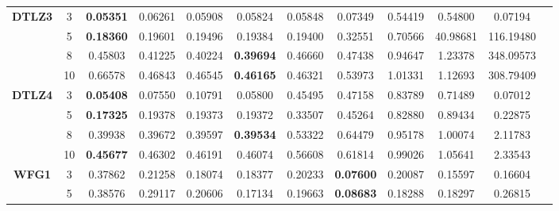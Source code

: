 \documentclass{sig-alternate}
\begin{document}
\begin{table}[!htb]
\begin{tabular}{|c|c|c|c|c|c|c|c|c|c|c|c|}
		\multirow{4}{*}{\textbf{DTLZ3}} & 3          & \textbf{0.05351} & 0.06261           & 0.05908               & 0.05824          & 0.05848             & 0.07349             & 0.54419            & 0.54800              & 0.07194          \\ \cline{2-11} 
		& 5          & \textbf{0.18360} & 0.19601           & 0.19496               & 0.19384          & 0.19400             & 0.32551             & 0.70566            & 40.98681             & 116.19480        \\ \cline{2-11} 
		& 8          & 0.45803          & 0.41225           & 0.40224               & \textbf{0.39694} & 0.46660             & 0.47438             & 0.94647            & 1.23378              & 348.09573        \\ \cline{2-11} 
		& 10         & 0.66578          & 0.46843           & 0.46545               & \textbf{0.46165} & 0.46321             & 0.53973             & 1.01331            & 1.12693              & 308.79409        \\ \hline
		\multirow{4}{*}{\textbf{DTLZ4}} & 3          & \textbf{0.05408} & 0.07550           & 0.10791               & 0.05800          & 0.45495             & 0.47158             & 0.83789            & 0.71489              & 0.07012          \\ \cline{2-11} 
		& 5          & \textbf{0.17325} & 0.19378           & 0.19373               & 0.19372          & 0.33507             & 0.45264             & 0.82880            & 0.89434              & 0.22875          \\ \cline{2-11} 
		& 8          & 0.39938          & 0.39672           & 0.39597               & \textbf{0.39534} & 0.53322             & 0.64479             & 0.95178            & 1.00074              & 2.11783          \\ \cline{2-11} 
		& 10         & \textbf{0.45677} & 0.46302           & 0.46191               & 0.46074          & 0.56608             & 0.61814             & 0.99026            & 1.05641              & 2.33543          \\ \hline
		\multirow{4}{*}{\textbf{WFG1}}  & 3          & 0.37862          & 0.21258           & 0.18074               & 0.18377          & 0.20233             & \textbf{0.07600}    & 0.20087            & 0.15597              & 0.16604          \\ \cline{2-11} 
		& 5          & 0.38576          & 0.29117           & 0.20606               & 0.17134          & 0.19663             & \textbf{0.08683}    & 0.18288            & 0.18297              & 0.26815          \\ \cline{2-11} 

\end{tabular}
\end{table}
\end{document}
